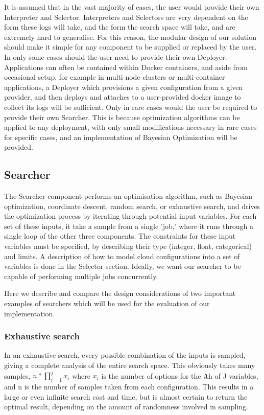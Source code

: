 \documentclass{article}
\begin{document}
It is assumed that in the vast majority of cases, the user would provide their own Interpreter and Selector. Interpreters and Selectors are very dependent on the form these logs will take, and the form the search space will take, and are extremely hard to generalise. For this reason, the modular design of our solution should make it simple for any component to be supplied or replaced by the user. In only some cases should the user need to provide their own Deployer. Applications can often be contained within Docker containers, and aside from occasional setup, for example in multi-node clusters or multi-container applications, a Deployer which provisions a given configuration from a given provider, and then deploys and attaches to a user-provided docker image to collect its logs will be sufficient.  Only in rare cases would the user be required to provide their own Searcher. This is because optimization algorithms can be applied to any deployment, with only small modifications necessary in rare cases for specific cases, and an implementation of Bayesian Optimization will be provided.

\subsection{Searcher}
The Searcher component performs an optimisation algorithm, such as Bayesian optimization, coordinate descent, random search, or exhaustive search, and drives the optimization process by iterating through potential input variables. For each set of these inputs, it take a sample from a single 'job,' where it runs through a single loop of the other three components. The constraints for these input variables must be specified, by describing their type (integer, float, categorical) and limits. A description of how to model cloud configurations into a set of variables is done in the Selector section. Ideally, we want our searcher to be capable of performing multiple jobs concurrently.

Here we describe and compare the design considerations of two important examples of searchers which will be used for the evaluation of our implementation.

\subsubsection{Exhaustive search}
In an exhaustive search, every possible combination of the inputs is sampled, giving a complete analysis of the entire search space. This obviously takes many samples, $n * \prod_{i=1}^{j} x_{i}$ where $x_{i}$ is the number of options for the \textit{i}th of J variables, and n is the number of samples taken from each configuration. This results in a large or even infinite search cost and time, but is almost certain to return the optimal result, depending on the amount of randomness involved in sampling.
\end{document}
